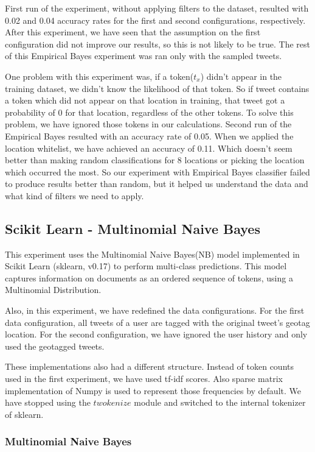 \documentclass[twoside,11pt]{article}
\begin{document}
First run of the experiment, without applying filters to the dataset, resulted with 0.02 and 0.04 accuracy rates for the first and second configurations, respectively. After this experiment, we have seen that the assumption on the first configuration did not improve our results, so this is not likely to be true. The rest of this Empirical Bayes experiment was ran only with the sampled tweets.

One problem with this experiment was, if a token($t_x$) didn't appear in the training dataset, we didn't know the likelihood of that token. So if tweet contains a token which did not appear on that location in training, that tweet got a probability of 0 for that location, regardless of the other tokens. To solve this problem, we have ignored those tokens in our calculations. Second run of the Empirical Bayes resulted with an accuracy rate of 0.05. When we applied the location whitelist, we have achieved an accuracy of 0.11. Which doesn't seem better than making random classifications for 8 locations or picking the location which occurred the most. So our experiment with Empirical Bayes classifier failed to produce results better than random, but it helped us understand the data and what kind of filters we need to apply.

\subsection{Scikit Learn - Multinomial Naive Bayes}
This experiment uses the Multinomial Naive Bayes(NB) model implemented in Scikit Learn \cite{scikit-learn}(sklearn, v0.17) to perform multi-class predictions. This model captures information on documents as an ordered sequence of tokens\cite{mccallum1998comparison}, using a Multinomial Distribution.

Also, in this experiment, we have redefined the data configurations. For the first data configuration, all tweets of a user are tagged with the original tweet's geotag location.  For the second configuration, we have ignored the user history and only used the geotagged tweets.

These implementations also had a different structure. Instead of token counts used in the first experiment, we have used tf-idf scores. Also sparse matrix implementation of Numpy is used to represent those frequencies by default. We have stopped using the $twokenize$ module and switched to the internal tokenizer of sklearn.

\subsubsection{Multinomial Naive Bayes}
\end{document}

